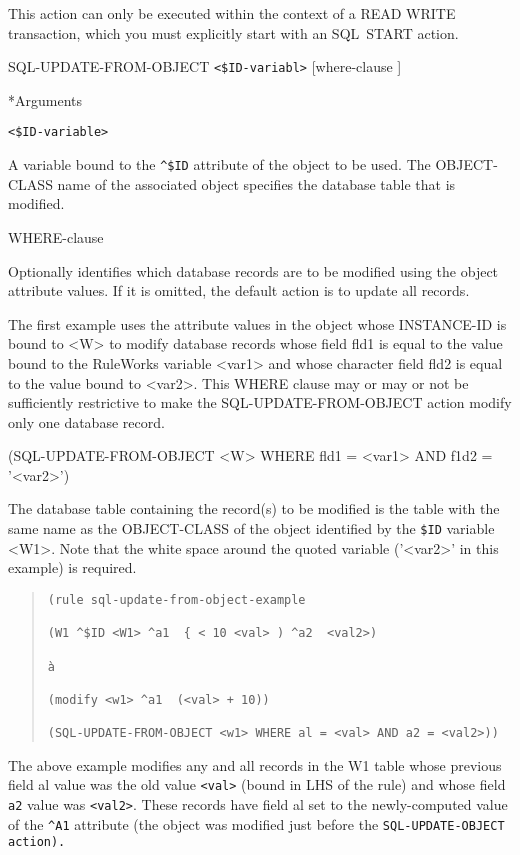 {{This action can only be executed within the context of a READ
WRITE transaction, which you must explicitly start with an
SQL~START action.



\Format

SQL-UPDATE-FROM-OBJECT \verb|<$ID-variabl>| [where-clause ]



*Arguments

\verb|<$ID-variable>|

A variable bound to the \verb|^$ID| attribute of the object to be
used. The OBJECT-CLASS name of the associated object specifies the database
table that is modified.

WHERE-clause

Optionally identifies which database records are to be
modified using the object attribute values. If it is omitted,
the default action is to update all records.



\Example

The first example uses the attribute values in the object
whose INSTANCE-ID is bound to <W> to modify database records
whose field fld1 is equal to the value bound to the RuleWorks
variable <var1> and whose character field fld2 is equal to
the value bound to <var2>. This WHERE clause may or may or
not be sufficiently restrictive to make the
SQL-UPDATE-FROM-OBJECT action modify only one database
record.



(SQL-UPDATE-FROM-OBJECT <W> WHERE fld1 = <var1> AND f1d2 =
'<var2>')



The database table containing the record(s) to be modified is
the table with the same name as the OBJECT-CLASS of the
object identified by the \verb|$ID| variable <W1>. Note that the
white space around the quoted variable ('<var2>' in this
example) is required.
\begin{quote}
\begin{verbatim}
(rule sql-update-from-object-example

(W1 ^$ID <W1> ^a1  { < 10 <val> ) ^a2  <val2>)

à

(modify <w1> ^a1  (<val> + 10))

(SQL-UPDATE-FROM-OBJECT <w1> WHERE al = <val> AND a2 = <val2>))
\end{verbatim}
\end{quote}

The above example modifies any and all records in the W1 table whose
previous field al value was the old value \verb|<val>| (bound in LHS
of the rule) and whose field \verb|a2| value was \verb|<val2>|. These
records have field al set to the newly-computed value of the
\verb|^A1| attribute (the object was modified just before the
\tt{SQL-UPDATE-OBJECT} action).

}}

